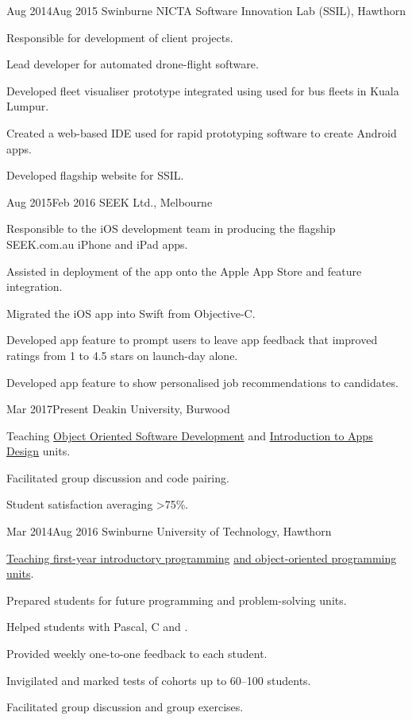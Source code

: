 {Aug 2014}{Aug 2015}
{Swinburne NICTA Software Innovation Lab (SSIL), Hawthorn}
{
  \item Responsible for development of client projects.
}
{
  \item Lead developer for automated drone-flight software.
  \item Developed fleet visualiser prototype integrated using used for bus fleets in Kuala Lumpur.
  \item Created a web-based IDE used for rapid prototyping software to create Android apps.
  \item Developed flagship website for SSIL.
}

{Aug 2015}{Feb 2016}
{SEEK Ltd., Melbourne}
{
  \item Responsible to the iOS development team in producing the flagship SEEK.com.au iPhone and iPad apps.
  \item Assisted in deployment of the app onto the Apple App Store and feature integration.
  \item Migrated the iOS app into Swift from Objective-C.
}
{
  \item Developed app feature to prompt users to leave app feedback that improved ratings from 1  to 4.5 stars on launch-day alone.
  \item Developed app feature to show personalised job recommendations to candidates.
}

{Mar 2017}{Present}
{Deakin University, Burwood}
{\item Teaching \href{http://www.deakin.edu.au/current-students-courses/unit.php?unit=SIT232}{Object Oriented Software Development} and \href{http://www.deakin.edu.au/current-students-courses/unit.php?unit=SIT120}{Introduction to Apps Design} units.
}
{
  \item Facilitated group discussion and code pairing.
  \item Student satisfaction averaging >75\%.
}

{Mar 2014}{Aug 2016}
{Swinburne University of Technology, Hawthorn}
{\item \href{http://www.swinburne.edu.au/study/courses/units/Introduction-to-Programming-COS10009/local}{Teaching first-year introductory programming} \href{http://www.swinburne.edu.au/study/courses/units/Object-Oriented-Programming-COS70006/local}{and object-oriented programming units}.
  \item Prepared students for future programming and problem-solving units.
  \item Helped students with Pascal, C and \Csh{}.
}
{
  \item Provided weekly one-to-one feedback to each student.
  \item Invigilated and marked tests of cohorts up to 60--100 students.
  \item Facilitated group discussion and group exercises.
}

